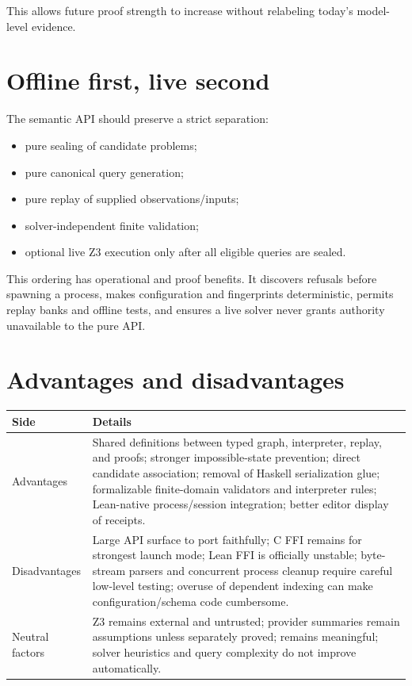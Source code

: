 \documentclass[10pt,letterpaper,oneside]{report}
\newcommand{\code}[1]{\texttt{\detokenize{#1}}}
\begin{document}
This allows future proof strength to increase without relabeling today's model-level evidence.

\section{Offline first, live second}

The semantic API should preserve a strict separation:

\begin{itemize}
  \item pure sealing of candidate problems;
  \item pure canonical query generation;
  \item pure replay of supplied observations/inputs;
  \item solver-independent finite validation;
  \item optional live Z3 execution only after all eligible queries are sealed.
\end{itemize}

This ordering has operational and proof benefits. It discovers refusals before spawning a process, makes configuration and fingerprints deterministic, permits replay banks and offline tests, and ensures a live solver never grants authority unavailable to the pure API.

\section{Advantages and disadvantages}

\begin{longtable}{@{}L{0.18\textwidth}L{0.74\textwidth}@{}}
\toprule
\textbf{Side} & \textbf{Details} \\
\midrule
\endhead
Advantages & Shared definitions between typed graph, interpreter, replay, and proofs; stronger impossible-state prevention; direct candidate association; removal of Haskell serialization glue; formalizable finite-domain validators and interpreter rules; Lean-native process/session integration; better editor display of receipts. \\
Disadvantages & Large API surface to port faithfully; C FFI remains for strongest launch mode; Lean FFI is officially unstable; byte-stream parsers and concurrent process cleanup require careful low-level testing; overuse of dependent indexing can make configuration/schema code cumbersome. \\
Neutral factors & Z3 remains external and untrusted; provider summaries remain assumptions unless separately proved; \code{unknown} remains meaningful; solver heuristics and query complexity do not improve automatically. \\
\bottomrule
\end{longtable}
\end{document}
